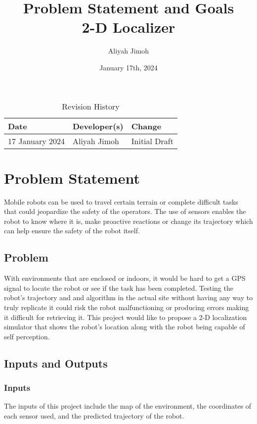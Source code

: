 \documentclass{article}
\title{Problem Statement and Goals\\2-D Localizer}
\author{Aliyah Jimoh}
\date{January 17th, 2024}
\begin{document}
\maketitle

\begin{table}[hp]
\caption{Revision History} \label{TblRevisionHistory}
\begin{tabularx}{\textwidth}{llX}
\toprule
\textbf{Date} & \textbf{Developer(s)} & \textbf{Change}\\
\midrule
17 January 2024 & Aliyah Jimoh & Initial Draft\\

\bottomrule
\end{tabularx}
\end{table}

\section{Problem Statement}
Mobile robots can be used to travel certain terrain or complete difficult tasks that could jeopardize the safety of the operators. The use of sensors enables the robot to know where it is, make proactive reactions or change its trajectory which can help ensure the safety of the robot itself.
\subsection{Problem}
With environments that are enclosed or indoors, it would be hard to get a GPS signal to locate the robot or see if the task has been completed. Testing the robot's trajectory and and algorithm in the actual site without having any way to truly replicate it could risk the robot malfunctioning or producing errors making it difficult for retrieving it. This project would like to propose a 2-D localization simulator that shows the robot's location along with the robot being capable of self perception.

\subsection{Inputs and Outputs}

\subsubsection{Inputs}
The inputs of this project include the map of the environment, the coordinates of each sensor used, and the predicted trajectory of the robot.
\end{document}
